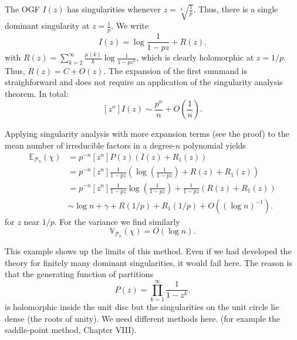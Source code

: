 \begin{exm}
\label{exm:anapoly}

The OGF $I(z)$ has singularities whenever $z = \sqrt[k]{\frac{1}{p}}$.
Thus, there is a single dominant singularity at $z = \frac{1}{p}$.
We write
\[
    I(z) = \log \frac{1}{1-pz} + R(z).
\]
with $R(z) = \sum_{k=2}^\infty \frac{\mu(k)}{k} \log \frac{1}{1 - p z^k}$, which is clearly holomorphic at $z = 1/p$. Thus, $R(z) = C + O(z)$.
The expansion of the first summand is straighforward and does not require an application of the singularity analysis theorem.
In total:
\[
[z^n] I(z) \sim \frac{p^n}{n} + O\left( \frac{1}{n} \right).
\]

Applying singularity analysis with more expansion terms (see the proof) to the mean number of irreducible factors in a degree-$n$ polynomial yields
\begin{align*}
    \mathbb{E}_{\mathcal{P}_n}(\chi) 
    &= p^{-n} [z^n] P(z) ( I(z) + R_1(z)) \\
    &= p^{-n} [z^n] \frac{1}{1-pz} \left( \log\left(\frac{1}{1-pz}\right) + R(z) + R_1(z) \right) \\
    &= p^{-n} [z^n] \frac{1}{1-pz} \log\left(\frac{1}{1-pz}\right) + \frac{1}{1-pz}(R(z) + R_1(z)) \\
    &\sim \log n + \gamma + R(1/p) + R_1(1/p) + O((\log n)^{-1}).
\end{align*}
for $z$ near $1/p$.
For the variance we find similarly
\[
    \mathbb{V}_{\mathcal{P}_n}(\chi)  = O(\log n).
\]
\end{exm}





\begin{exm}
This example shows up the limits of this method. Even if we had developed the theory for finitely many dominant singularities, it would fail here.
The reason is that the generating function of partitions
\[
    P(z) = \prod_{k=1}^\infty \frac{1}{1-z^k}.
\]
is holomorphic inside the unit disc but the singularities on the unit circle lie dense (the roots of unity).
We need different methods here. (for example the saddle-point method, \cite{analyticcombinatorics} Chapter VIII).
\label{exm:anaparts}

\end{exm}
